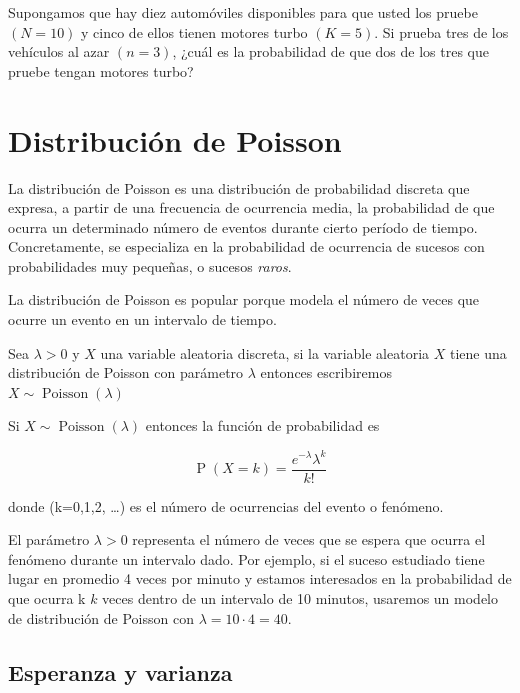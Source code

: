 \documentclass[]{book}
\theoremstyle{plain}
\theoremstyle{definition}
\theoremstyle{definition} %
\begin{document}
Supongamos que hay diez automóviles disponibles para que usted los
pruebe \((N = 10)\) y cinco de ellos tienen motores turbo \((K = 5)\).
Si prueba tres de los vehículos al azar \((n = 3)\), ¿cuál es la
probabilidad de que dos de los tres que pruebe tengan motores turbo?

\hypertarget{distribuciuxf3n-de-poisson}{%
\section{Distribución de Poisson}\label{distribuciuxf3n-de-poisson}}

La distribución de Poisson es una distribución de probabilidad discreta
que expresa, a partir de una frecuencia de ocurrencia media, la
probabilidad de que ocurra un determinado número de eventos durante
cierto período de tiempo. Concretamente, se especializa en la
probabilidad de ocurrencia de sucesos con probabilidades muy pequeñas, o
sucesos \emph{raros}.

La distribución de Poisson es popular porque modela el número de veces
que ocurre un evento en un intervalo de tiempo.

Sea \(\displaystyle \lambda >0\) y \(X\) una variable aleatoria
discreta, si la variable aleatoria \(X\) tiene una distribución de
Poisson con parámetro \(\lambda\) entonces escribiremos
\(\displaystyle X\sim \operatorname {Poisson} (\lambda )\)

Si \(\displaystyle X\sim \operatorname {Poisson} (\lambda )\) entonces
la función de probabilidad es

\[\displaystyle \operatorname {P} (X=k)={\frac {e^{-\lambda }\lambda ^{k}}{k!}}\]

donde (k=0,1,2, \dots ) es el número de ocurrencias del evento o
fenómeno.

El parámetro \(\displaystyle \lambda >0\) representa el número de veces
que se espera que ocurra el fenómeno durante un intervalo dado. Por
ejemplo, si el suceso estudiado tiene lugar en promedio 4 veces por
minuto y estamos interesados en la probabilidad de que ocurra k \(k\)
veces dentro de un intervalo de 10 minutos, usaremos un modelo de
distribución de Poisson con \(\lambda = 10\cdot 4 = 40\).

\hypertarget{esperanza-y-varianza-2}{%
\subsection{Esperanza y varianza}\label{esperanza-y-varianza-2}}
\end{document}
